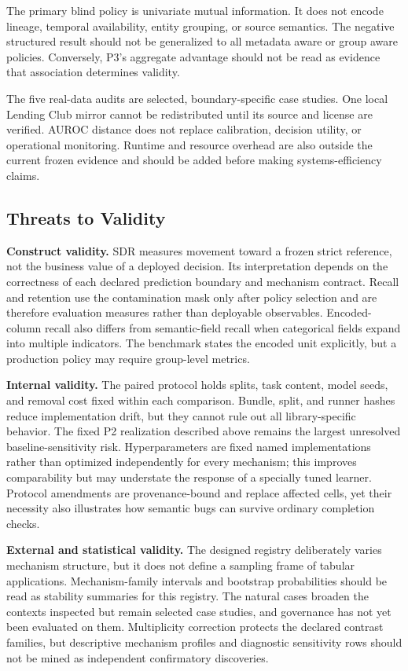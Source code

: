 \documentclass[sigconf,review]{acmart}
\begin{document}
The primary blind policy is univariate mutual information. It does not encode
lineage, temporal availability, entity grouping, or source semantics. The
negative structured result should not be generalized to all metadata aware or
group aware policies. Conversely, P3's aggregate advantage should not be read
as evidence that association determines validity.

The five real-data audits are selected, boundary-specific case studies. One
local Lending Club mirror cannot be redistributed until its source and license
are verified. AUROC distance does not replace calibration, decision utility,
or operational monitoring. Runtime and resource overhead are also outside the
current frozen evidence and should be added before making systems-efficiency
claims.

\subsection{Threats to Validity}

\textbf{Construct validity.} SDR measures movement toward a frozen strict
reference, not the business value of a deployed decision. Its interpretation
depends on the correctness of each declared prediction boundary and mechanism
contract. Recall and retention use the contamination mask only after policy
selection and are therefore evaluation measures rather than deployable
observables. Encoded-column recall also differs from semantic-field recall when
categorical fields expand into multiple indicators. The benchmark states the
encoded unit explicitly, but a production policy may require group-level
metrics.

\textbf{Internal validity.} The paired protocol holds splits, task content,
model seeds, and removal cost fixed within each comparison. Bundle, split, and
runner hashes reduce implementation drift, but they cannot rule out all
library-specific behavior. The fixed P2 realization described above remains the
largest unresolved baseline-sensitivity risk. Hyperparameters are fixed named
implementations rather than optimized independently for every mechanism; this
improves comparability but may understate the response of a specially tuned
learner. Protocol amendments are provenance-bound and replace affected cells,
yet their necessity also illustrates how semantic bugs can survive ordinary
completion checks.

\textbf{External and statistical validity.} The designed registry deliberately
varies mechanism structure, but it does not define a sampling frame of tabular
applications. Mechanism-family intervals and bootstrap probabilities should be
read as stability summaries for this registry. The natural cases broaden the
contexts inspected but remain selected case studies, and governance has not yet
been evaluated on them. Multiplicity correction protects the declared contrast
families, but descriptive mechanism profiles and diagnostic sensitivity rows
should not be mined as independent confirmatory discoveries.
\end{document}
